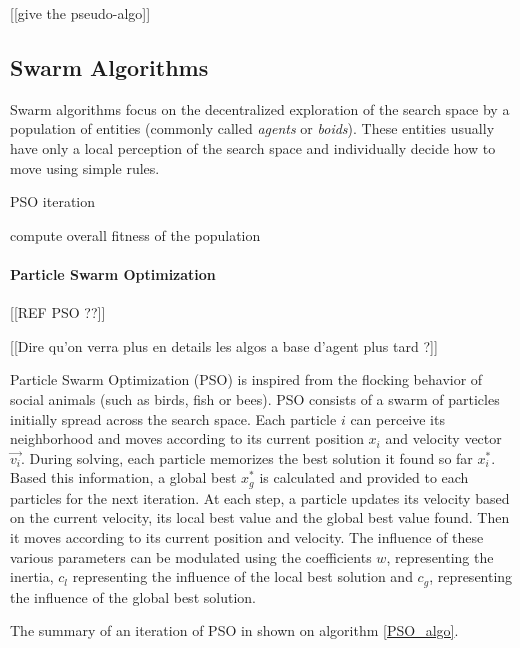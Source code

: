 [[give the pseudo-algo]]

\subsection{Swarm Algorithms}

Swarm algorithms focus on the decentralized exploration of the search space by a population of entities (commonly called \emph{agents} or \emph{boids}). These entities usually have only a local perception of the search space and individually decide how to move using simple rules.

\begin{algorithm}
\caption{PSO iteration}\label{PSO_algo}
\begin{algorithmic}

	compute overall fitness of the population\;

\end{algorithmic}
\end{algorithm}

\paragraph*{Particle Swarm Optimization}

[[REF PSO ??]]

[[Dire qu'on verra plus en details les algos a base d'agent plus tard ?]]

Particle Swarm Optimization (PSO) is inspired from the flocking behavior of social animals (such as birds, fish or bees). PSO consists of a swarm of particles initially spread across the search space. Each particle $i$ can perceive its neighborhood and moves according to its current position $x_i$ and velocity vector $\overrightarrow{v_i}$.
During solving, each particle memorizes the best solution it found so far $x_i^*$. Based this information, a global best $x_g^*$ is calculated and provided to each particles for the next iteration.
At each step, a particle updates its velocity based on the current velocity, its local best value and the global best value found. Then it moves according to its current position and velocity. The influence of these various parameters can be modulated using the coefficients $w$, representing the inertia, $c_l$ representing the influence of the local best solution and $c_g$, representing the influence of the global best solution.

The summary of an iteration of PSO in shown on algorithm \ref{PSO_algo}.

